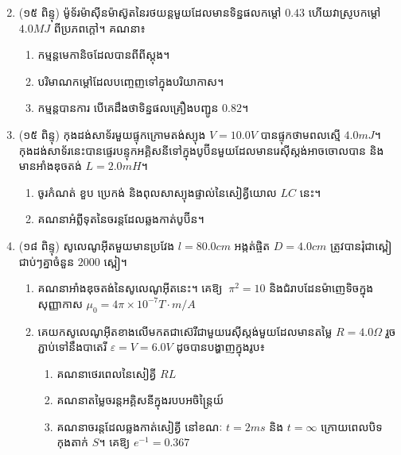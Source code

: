 \documentclass{officialexam}
\begin{document}
\begin{enumerate}[I]
\begin{multicols}{2}
		\end{multicols}
		\item (១៥ ពិន្ទុ)  ម៉ូទ័រម៉ាសុីនម៉ាស៊ូតនៃរថយន្តមួយដែលមានទិន្នផលកម្តៅ $0.43$ ហើយវាស្រូបកម្តៅ $4.0MJ$ ពីប្រភពក្តៅ។ គណនា៖
		\begin{enumerate}[k]
			\item កម្មន្តមេកានិចដែលបានពីពីស្តុង។
			\item បរិមាណកម្តៅដែលបញ្ចេញទៅក្នុងបរិយាកាស។
			\item កម្មន្តបានការ បើគេដឹងថាទិន្នផលគ្រឿងបញ្ជូន $0.82$។
		\end{enumerate}
		\item (១៥ ពិន្ទុ) កុងដង់សាទ័រមួយផ្ទុកក្រោមតង់ស្យុង $V=10.0V$ បានផ្ទុកថាមពលស្មើ $4.0mJ$។ កុងដង់សាទ័រនេះបានផ្ទេរបន្ទុកអគ្គិសនីទៅក្នុងបូប៊ីនមួយដែលមានរេសុីស្តង់អាចចោលបាន និងមានអាំងឌុចតង់ $L=2.0mH$។
		\begin{enumerate}[k]
			\item ចូរកំណត់ ខួប ប្រេកង់ និងពុល​​សា​​ស្យុងផ្ទាល់នៃសៀគ្វីយោល $LC$ នេះ។
			\item គណនាអំព្លីទុតនៃចរន្តដែលឆ្លងកាត់បូប៊ីន។
		\end{enumerate}
		\item (១៨ ពិន្ទុ) សូលេណូអុីតមួយមានប្រវែង $l=80.0cm$ អង្កត់ផ្ចិត $D=4.0cm$ ត្រូវបានរុំជា​​ស្ពៀ​​​​ជាប់ៗ​​គ្នាចំនួន $2000$ ស្ពៀ។
		\begin{enumerate}[m]
			\item គណនាអាំងឌុចតង់នៃសូលេណូអុីតនេះ។ គេឱ្យ $~\pi^2=10$ និងជំរាបដែនម៉ាញេទិចក្នុងសុញ្ញាកាស $\mu_0=4\pi\times10^{-7}T\cdot m/A$
			\item គេយកសូលេណូអុីតខាងលើមកតជាស៊េរីជាមួយរេសុីស្តង់មួយដែលមានតម្លៃ $R=4.0\Omega$ រួចភ្ជាប់ទៅនឹងបាតេរី $\varepsilon=V=6.0V$ ដូចបានបង្ហាញក្នុងរូប៖
			\begin{multicols}{2}
				\begin{enumerate}[k]
					\item គណនាថេរពេលនៃសៀគ្វី $RL$
					\item គណនាតម្លៃចរន្តអគ្គិសនីក្នុងរបបអចិ​​ន្រៃ្តយ៍
					\item គណនាចរន្តដែលឆ្លងកាត់សៀគ្វី នៅខណៈ $t=2ms$ និង $t=\infty$ ក្រោយពេលបិទកុងតាក់ $S$។
					គេឱ្យ $e^{-1}=0.367$
				\end{enumerate}

\end{multicols}
\end{enumerate}
\end{enumerate}
\end{document}
